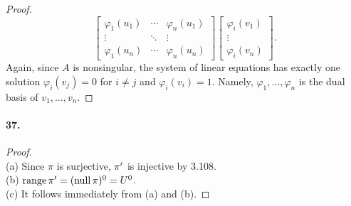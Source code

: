 \begin{proof}
\[\begin{bmatrix}
        \varphi_1(u_1) & \cdots & \varphi_n(u_1) \\
        \vdots         & \ddots & \vdots         \\
        \varphi_1(u_n) & \cdots & \varphi_n(u_n)
      \end{bmatrix}
      \begin{bmatrix}
        \varphi_i(v_1) \\ \vdots \\ \varphi_i(v_n)
      \end{bmatrix}.
    \]
    Again, since $A$ is nonsingular, the system of linear equations has exactly 
    one solution $\varphi_i(v_j) = 0$ for $i\ne j$ and $\varphi_i(v_i)=1$. 
    Namely, $\varphi_1,\dots,\varphi_n$ is the dual basis of $v_1,\dots,v_n$.
  \end{proof}

  \paragraph{37.}
  \begin{proof}
    $\,$\\
    (a) Since $\pi$ is surjective, $\pi^\prime$ is injective by 3.108. \\
    (b) $\operatorname{range}\pi^\prime = (\operatorname{null}\pi)^0 = U^0$. \\
    (c) It follows immediately from (a) and (b).
  \end{proof}
